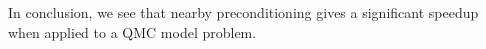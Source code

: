     In conclusion, we see that nearby preconditioning gives a significant speedup when applied to a QMC model problem.%
    

    





